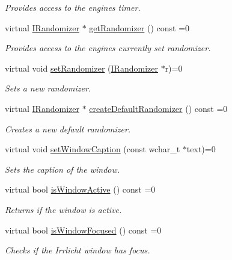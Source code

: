 \begin{DoxyCompactItemize}
\begin{DoxyCompactList}\small\item\em Provides access to the engine\textquotesingle{}s timer. \end{DoxyCompactList}\item 
virtual \hyperlink{classirr_1_1IRandomizer}{I\+Randomizer} $\ast$ \hyperlink{classirr_1_1IrrlichtDevice_aaba0cb18cac48e381d841ad763c7ea8b}{get\+Randomizer} () const =0
\begin{DoxyCompactList}\small\item\em Provides access to the engine\textquotesingle{}s currently set randomizer. \end{DoxyCompactList}\item 
virtual void \hyperlink{classirr_1_1IrrlichtDevice_af996a8a8031dacd823e3c65ee3ed2c33}{set\+Randomizer} (\hyperlink{classirr_1_1IRandomizer}{I\+Randomizer} $\ast$r)=0
\begin{DoxyCompactList}\small\item\em Sets a new randomizer. \end{DoxyCompactList}\item 
virtual \hyperlink{classirr_1_1IRandomizer}{I\+Randomizer} $\ast$ \hyperlink{classirr_1_1IrrlichtDevice_a267b069ea2c5f5b008fd7afa5b931ee9}{create\+Default\+Randomizer} () const =0
\begin{DoxyCompactList}\small\item\em Creates a new default randomizer. \end{DoxyCompactList}\item 
virtual void \hyperlink{classirr_1_1IrrlichtDevice_a3d7c98d520bf18ce1973c6f1439a7c0f}{set\+Window\+Caption} (const wchar\+\_\+t $\ast$text)=0
\begin{DoxyCompactList}\small\item\em Sets the caption of the window. \end{DoxyCompactList}\item 
virtual bool \hyperlink{classirr_1_1IrrlichtDevice_abd3c88336b739da2694883d5ffd25a70}{is\+Window\+Active} () const =0
\begin{DoxyCompactList}\small\item\em Returns if the window is active. \end{DoxyCompactList}\item 
virtual bool \hyperlink{classirr_1_1IrrlichtDevice_a960069dc52b4f1303d18945dcbad7f3a}{is\+Window\+Focused} () const =0
\begin{DoxyCompactList}\small\item\em Checks if the Irrlicht window has focus. \end{DoxyCompactList}\item 

\end{DoxyCompactItemize}

